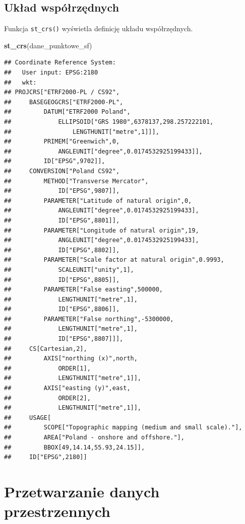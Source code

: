 \documentclass[
  paper=6in:9in,pagesize=pdftex,headinclude=on,footinclude=on,10pt]{scrbook}
\newenvironment{Shaded}{\begin{snugshade}}{\end{snugshade}}
\newcommand{\FunctionTok}[1]{\textcolor[rgb]{0.13,0.29,0.53}{\textbf{#1}}}
\newcommand{\NormalTok}[1]{#1}
\begin{document}
\subsection{Układ współrzędnych}\label{ukux142ad-wspuxf3ux142rzux119dnych}

Funkcja \texttt{st\_crs()} wyświetla definicję układu współrzędnych.

\begin{Shaded}
\begin{Highlighting}[]
\FunctionTok{st\_crs}\NormalTok{(dane\_punktowe\_sf)}
\end{Highlighting}
\end{Shaded}

\begin{verbatim}
## Coordinate Reference System:
##   User input: EPSG:2180 
##   wkt:
## PROJCRS["ETRF2000-PL / CS92",
##     BASEGEOGCRS["ETRF2000-PL",
##         DATUM["ETRF2000 Poland",
##             ELLIPSOID["GRS 1980",6378137,298.257222101,
##                 LENGTHUNIT["metre",1]]],
##         PRIMEM["Greenwich",0,
##             ANGLEUNIT["degree",0.0174532925199433]],
##         ID["EPSG",9702]],
##     CONVERSION["Poland CS92",
##         METHOD["Transverse Mercator",
##             ID["EPSG",9807]],
##         PARAMETER["Latitude of natural origin",0,
##             ANGLEUNIT["degree",0.0174532925199433],
##             ID["EPSG",8801]],
##         PARAMETER["Longitude of natural origin",19,
##             ANGLEUNIT["degree",0.0174532925199433],
##             ID["EPSG",8802]],
##         PARAMETER["Scale factor at natural origin",0.9993,
##             SCALEUNIT["unity",1],
##             ID["EPSG",8805]],
##         PARAMETER["False easting",500000,
##             LENGTHUNIT["metre",1],
##             ID["EPSG",8806]],
##         PARAMETER["False northing",-5300000,
##             LENGTHUNIT["metre",1],
##             ID["EPSG",8807]]],
##     CS[Cartesian,2],
##         AXIS["northing (x)",north,
##             ORDER[1],
##             LENGTHUNIT["metre",1]],
##         AXIS["easting (y)",east,
##             ORDER[2],
##             LENGTHUNIT["metre",1]],
##     USAGE[
##         SCOPE["Topographic mapping (medium and small scale)."],
##         AREA["Poland - onshore and offshore."],
##         BBOX[49,14.14,55.93,24.15]],
##     ID["EPSG",2180]]
\end{verbatim}

\section{Przetwarzanie danych przestrzennych}\label{przetwarzanie-danych-przestrzennych}
\end{document}
